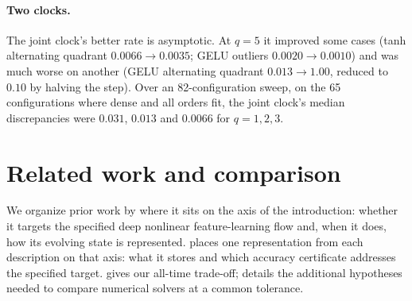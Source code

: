 \documentclass[11pt]{article}
\theoremstyle{definition}
\theoremstyle{remark}
\begin{document}
\paragraph{Two clocks.}
The joint clock's better rate is asymptotic. At $q=5$ it improved some cases
(tanh alternating quadrant $0.0066\to0.0035$; GELU outliers $0.0020\to0.0010$)
and was much worse on another (GELU alternating quadrant $0.013\to1.00$, reduced
to $0.10$ by halving the step). Over an 82-configuration sweep, on the 65
configurations where dense and all orders fit, the joint clock's median
discrepancies were $0.031$, $0.013$ and $0.0066$ for $q=1,2,3$.

\section{Related work and comparison}
\label{sec:related}
We organize prior work by where it sits on the axis of the introduction: whether
it targets the specified deep nonlinear feature-learning flow and, when it
does, how its evolving state is represented.   places one
representation from each description on that axis: what it stores and which
accuracy certificate addresses the specified target.   gives
our all-time trade-off;  details the additional hypotheses
needed to compare numerical solvers at a common tolerance.
\end{document}
